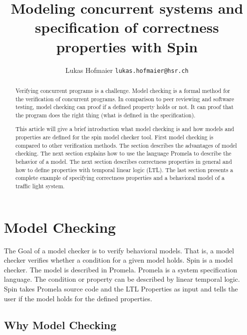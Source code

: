 \documentclass[a4paper, twoside]{article}
\begin{document}
\lstset{
basicstyle=\small\ttfamily,
xleftmargin=3.5em,
language=Promela
}

\title{Modeling concurrent systems and specification of correctness properties with Spin}
\author{Lukas Hofmaier \texttt{lukas.hofmaier@hsr.ch}}

\maketitle
\tableofcontents

\begin{abstract}
  Verifying concurrent programs is a challenge. Model checking is a formal method for the verification of concurrent programs. In comparison to peer reviewing and software testing, model checking can proof if a defined property holds or not. It can proof that the program does the right thing (what is defined in the specification).

This article will give a brief introduction what model checking is and how models and properties are defined for the spin model checker tool. First model checking is compared to other verification methods. The section describes the advantages of model checking. The next section explains how to use the language Promela to describe the behavior of a model. The next section describes correctness properties in general and how to define properties with temporal linear logic (LTL). The last section presents a complete example of specifying correctness properties and a behavioral model of a traffic light system.
\end{abstract}

\section{Model Checking}
\label{sec:modelchecking}

The Goal of a model checker is to verify behavioral models. That is, a model checker verifies whether a condition for a given model holds. Spin is a model checker. The model is described in Promela. Promela is a system specification language. The condition or property can be described by linear temporal logic.  Spin takes Promela source code and the LTL Properties as input and tells the user if the model holds for the defined properties.

\subsection{Why Model Checking}
\label{sec:why}
\end{document}
